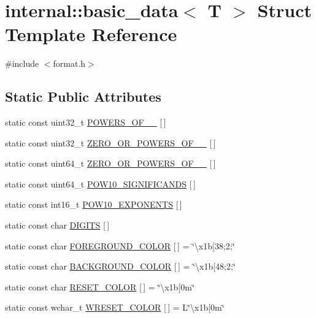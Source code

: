 \hypertarget{structinternal_1_1basic__data}{}\section{internal\+:\+:basic\+\_\+data$<$ T $>$ Struct Template Reference}
\label{structinternal_1_1basic__data}


{\ttfamily \#include $<$format.\+h$>$}

\subsection*{Static Public Attributes}
\begin{DoxyCompactItemize}
\item 
static const uint32\+\_\+t \hyperlink{structinternal_1_1basic__data_ae0a973c39e9ea682ddc6fa4aba44434f}{P\+O\+W\+E\+R\+S\+\_\+\+O\+F\+\_\+\_} \mbox{[}$\,$\mbox{]}
\item 
static const uint32\+\_\+t \hyperlink{structinternal_1_1basic__data_a6a14eac6cf34c81a72f244d46ec25b76}{Z\+E\+R\+O\+\_\+\+O\+R\+\_\+\+P\+O\+W\+E\+R\+S\+\_\+\+O\+F\+\_\+\_} \mbox{[}$\,$\mbox{]}
\item 
static const uint64\+\_\+t \hyperlink{structinternal_1_1basic__data_a5d9f5ec90e1d78c077d0b6ebfb8b519e}{Z\+E\+R\+O\+\_\+\+O\+R\+\_\+\+P\+O\+W\+E\+R\+S\+\_\+\+O\+F\+\_\+\_} \mbox{[}$\,$\mbox{]}
\item 
static const uint64\+\_\+t \hyperlink{structinternal_1_1basic__data_ab03db7a1e27eca63daa49e5e8d17199a}{P\+O\+W10\+\_\+\+S\+I\+G\+N\+I\+F\+I\+C\+A\+N\+DS} \mbox{[}$\,$\mbox{]}
\item 
static const int16\+\_\+t \hyperlink{structinternal_1_1basic__data_a41e41eca0a0bed1580095339e82a8a13}{P\+O\+W10\+\_\+\+E\+X\+P\+O\+N\+E\+N\+TS} \mbox{[}$\,$\mbox{]}
\item 
static const char \hyperlink{structinternal_1_1basic__data_a4499b69babdd8e4b4badeed17030ddc8}{D\+I\+G\+I\+TS} \mbox{[}$\,$\mbox{]}
\item 
static const char \hyperlink{structinternal_1_1basic__data_a2f51626a6c71cb0c8b3a205be0b581c7}{F\+O\+R\+E\+G\+R\+O\+U\+N\+D\+\_\+\+C\+O\+L\+OR} \mbox{[}$\,$\mbox{]} = \char`\"{}\textbackslash{}x1b\mbox{[}38;2;\char`\"{}
\item 
static const char \hyperlink{structinternal_1_1basic__data_a67b9e51c3f0e76efca886f498779bbe9}{B\+A\+C\+K\+G\+R\+O\+U\+N\+D\+\_\+\+C\+O\+L\+OR} \mbox{[}$\,$\mbox{]} = \char`\"{}\textbackslash{}x1b\mbox{[}48;2;\char`\"{}
\item 
static const char \hyperlink{structinternal_1_1basic__data_a73908f7884a501d0d749d9146b0b05eb}{R\+E\+S\+E\+T\+\_\+\+C\+O\+L\+OR} \mbox{[}$\,$\mbox{]} = \char`\"{}\textbackslash{}x1b\mbox{[}0m\char`\"{}
\item 
static const wchar\+\_\+t \hyperlink{structinternal_1_1basic__data_a5995f59c50962f1ec341dab8cddfe58f}{W\+R\+E\+S\+E\+T\+\_\+\+C\+O\+L\+OR} \mbox{[}$\,$\mbox{]} = L\char`\"{}\textbackslash{}x1b\mbox{[}0m\char`\"{}
\end{DoxyCompactItemize}


